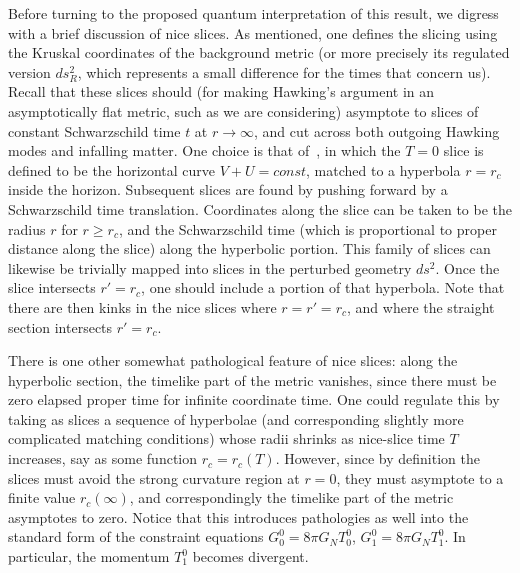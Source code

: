 Before turning to the proposed quantum interpretation of this result, we digress with a brief discussion of nice slices.  As mentioned, one defines the slicing using the Kruskal coordinates of the background metric (or more precisely its regulated version $ds_R^2$, which represents a small difference for the times that concern us).  Recall that these slices should (for making Hawking's argument in an asymptotically flat metric, such as we are considering) asymptote to slices of constant Schwarzschild time $t$ at $r\rightarrow\infty$, and cut across both  outgoing Hawking modes and infalling matter.  One choice is that of~, in which the $T=0$ slice is defined to be the horizontal curve $V+U=const$, matched to a hyperbola $r=r_c$ inside the horizon.  Subsequent slices are found by pushing forward by a Schwarzschild time translation.  Coordinates along the slice can be taken to be the radius $r$ for $r\geq r_c$, and the Schwarzschild time (which is proportional to proper distance along the slice) along the hyperbolic portion.  This family of slices can likewise be trivially mapped into slices in the perturbed geometry $ds^2$.  Once the slice intersects $r'=r_c$, one should include a portion of that hyperbola.  Note that there are then kinks in the nice slices where $r=r'=r_c$, and where the straight section intersects $r'=r_c$.  

There is one other somewhat pathological feature of nice slices: along the hyperbolic section, the timelike part of the metric vanishes, since there must be zero elapsed proper time for infinite coordinate time.  One could regulate this by taking as slices a sequence of hyperbolae (and corresponding slightly more complicated matching conditions) whose radii shrinks as nice-slice time $T$ increases, say as some function $r_c=r_c(T)$.  However, since by definition the slices must avoid the strong curvature region at $r=0$, they must asymptote to a finite value $r_c(\infty)$, and correspondingly the timelike part of the metric asymptotes to zero.  Notice that this introduces pathologies as well into the standard form of the constraint equations $G^0_0 = 8\pi G_NT^0_0$, $G^0_1 = 8\pi G_NT^0_1$.  In particular, the momentum $T^0_1$ becomes divergent.  


